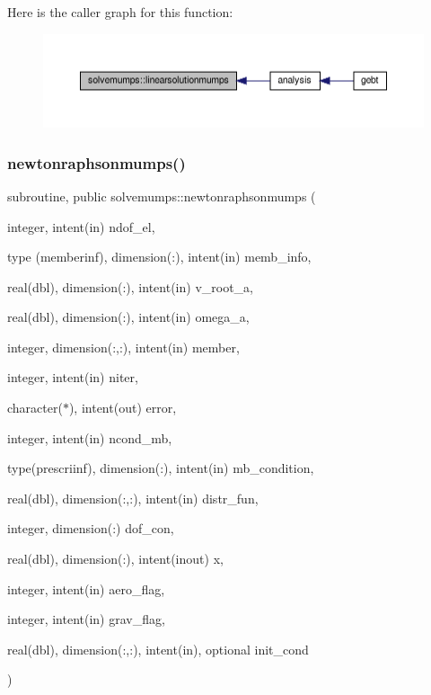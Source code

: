 Here is the caller graph for this function\+:\nopagebreak
\begin{figure}[H]
\begin{center}
\leavevmode
\includegraphics[width=350pt]{namespacesolvemumps_aad7849d30a944c0bd614bf4e103ef494_icgraph}
\end{center}
\end{figure}
\mbox{\label{namespacesolvemumps_a243ff65847b437ecb22933d782df2db4}} 
\subsubsection{\texorpdfstring{newtonraphsonmumps()}{newtonraphsonmumps()}}
{\footnotesize\ttfamily subroutine, public solvemumps\+::newtonraphsonmumps (\begin{DoxyParamCaption}\item[{integer, intent(in)}]{ndof\+\_\+el,  }\item[{type (memberinf), dimension(\+:), intent(in)}]{memb\+\_\+info,  }\item[{real(dbl), dimension(\+:), intent(in)}]{v\+\_\+root\+\_\+a,  }\item[{real(dbl), dimension(\+:), intent(in)}]{omega\+\_\+a,  }\item[{integer, dimension(\+:,\+:), intent(in)}]{member,  }\item[{integer, intent(in)}]{niter,  }\item[{character($\ast$), intent(out)}]{error,  }\item[{integer, intent(in)}]{ncond\+\_\+mb,  }\item[{type(prescriinf), dimension(\+:), intent(in)}]{mb\+\_\+condition,  }\item[{real(dbl), dimension(\+:,\+:), intent(in)}]{distr\+\_\+fun,  }\item[{integer, dimension(\+:)}]{dof\+\_\+con,  }\item[{real(dbl), dimension(\+:), intent(inout)}]{x,  }\item[{integer, intent(in)}]{aero\+\_\+flag,  }\item[{integer, intent(in)}]{grav\+\_\+flag,  }\item[{real(dbl), dimension(\+:,\+:), intent(in), optional}]{init\+\_\+cond }\end{DoxyParamCaption})}



